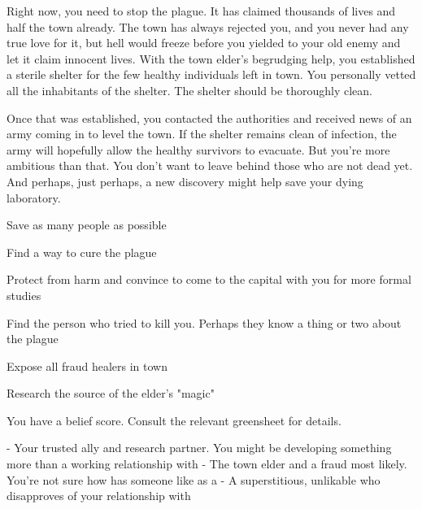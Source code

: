 \documentclass[char]{Pestilence}
\begin{document}
Right now, you need to stop the plague. It has claimed thousands of lives and half the town already. The town has always rejected you, and you never had any true love for it, but hell would freeze before you yielded to your old enemy and let it claim innocent lives. With the town elder's begrudging help, you established a sterile shelter for the few healthy individuals left in town. You personally vetted all the inhabitants of the shelter. The shelter should be thoroughly clean. 

Once that was established, you contacted the authorities and received news of an army coming in to level the town. If the shelter remains clean of infection, the army will hopefully allow the healthy survivors to evacuate. But you're more ambitious than that. You don't want to leave behind those who are not dead yet. And perhaps, just perhaps, a new discovery might help save your dying laboratory.

\begin{itemz}[Goals]
	\item Save as many people as possible
	\item Find a way to cure the plague
	\item Protect \cRebel{} from harm and convince \cRebel{\them} to come to the capital with you for more formal studies 
	\item Find the person who tried to kill you. Perhaps they know a thing or two about the plague
	\item Expose all fraud healers in town
	\item Research the source of the elder's "magic"
\end{itemz}

\begin{itemz}[Notes]
	\item You have a belief score. Consult the relevant greensheet for details. 
\end{itemz}

\begin{contacts}
	\contact{\cRebel{}} - Your trusted ally and research partner. You might be developing something more than a working relationship with \cRebel{\them}
	\contact{\cElder{}} - The town elder and a fraud most likely. You're not sure how \cRebel{} has someone like \cElder{\them} as a \cElder{\parent}
	\contact{\cApprentice{}} - A superstitious, unlikable \cApprentice{\human} who disapproves of your relationship with \cRebel{}
\end{contacts}
\end{document}
